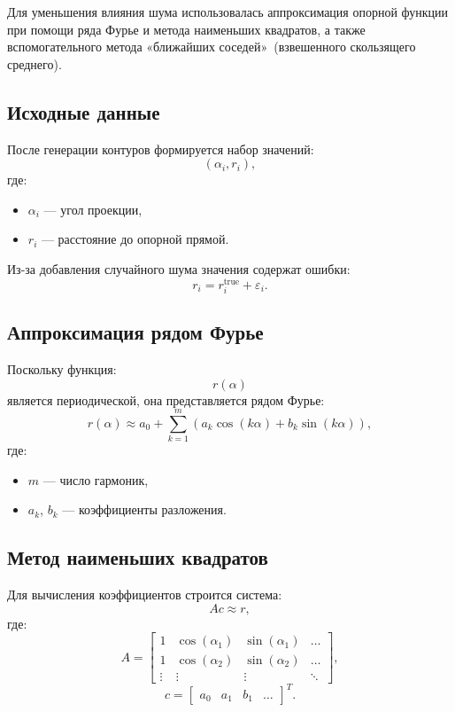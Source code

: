 \documentclass[12pt, a4paper]{article}
\begin{document}
Для уменьшения влияния шума использовалась аппроксимация опорной функции при помощи ряда Фурье и метода наименьших квадратов, а также вспомогательного метода «ближайших соседей»\ (взвешенного скользящего среднего).

\subsection{Исходные данные}

После генерации контуров формируется набор значений:
\[
(\alpha_i, r_i),
\]
где:
\begin{itemize}
    \item $\alpha_i$ — угол проекции,
    \item $r_i$ — расстояние до опорной прямой.
\end{itemize}

Из-за добавления случайного шума значения содержат ошибки:
\[
r_i = r_i^{\text{true}} + \varepsilon_i.
\]

\subsection{Аппроксимация рядом Фурье}

Поскольку функция:
\[
r(\alpha)
\]
является периодической, она представляется рядом Фурье:
\[
r(\alpha) \approx
a_0 +
\sum_{k=1}^{m}
\left(
a_k \cos(k\alpha)
+
b_k \sin(k\alpha)
\right),
\]
где:
\begin{itemize}
    \item $m$ — число гармоник,
    \item $a_k$, $b_k$ — коэффициенты разложения.
\end{itemize}

\subsection{Метод наименьших квадратов}

Для вычисления коэффициентов строится система:
\[
A c \approx r,
\]
где:
\[
A =
\begin{bmatrix}
1 & \cos(\alpha_1) & \sin(\alpha_1) & \dots \\
1 & \cos(\alpha_2) & \sin(\alpha_2) & \dots \\
\vdots & \vdots & \vdots & \ddots
\end{bmatrix},
\]
\[
c =
\begin{bmatrix}
a_0 & a_1 & b_1 & \dots
\end{bmatrix}^T.
\]
\end{document}
